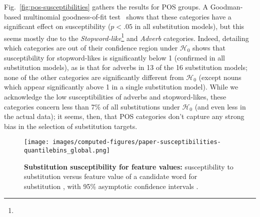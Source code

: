 \begin{new}

Fig.~\ref{fig:pos-susceptibilities} gathers the results for POS groups.
A Goodman-based multinomial goodness-of-fit test~\citep{goodman_simultaneous_1965} shows that these categories have a significant effect on susceptibility ($p < .05$ in all substitution models), but this seems mostly due to the \emph{Stopword-like}\footnote{
}
and \emph{Adverb} categories.
Indeed, detailing which categories are out of their confidence region under $\mathcal{H}_0$ shows that susceptibility for stopword-likes is significantly below 1 (confirmed in all substitution models), as is that for adverbs in 13 of the 16 substitution models;
none of the other categories are significantly different from $\mathcal{H}_0$ (except nouns which appear significantly above 1 in a single substitution model).
While we acknowledge the low susceptibilities of adverbs and stopword-likes, these categories concern less than 7\% of all substitutions under $\mathcal{H}_0$ (and even less in the actual data);
it seems, then, that POS categories don't capture any strong bias in the selection of substitution targets.

\end{new}

\begin{figure*}[!th]
    \centering
    \texttt{[image: images/computed-figures/paper-susceptibilities-quantilebins\_global.png]}
    \caption{\textbf{Substitution susceptibility for feature values:}
    susceptibility to substitution versus feature value of a candidate word for substitution , with 95\% asymptotic confidence intervals .
    }
    \label{fig:feature-susceptibilities-global}
\end{figure*}

